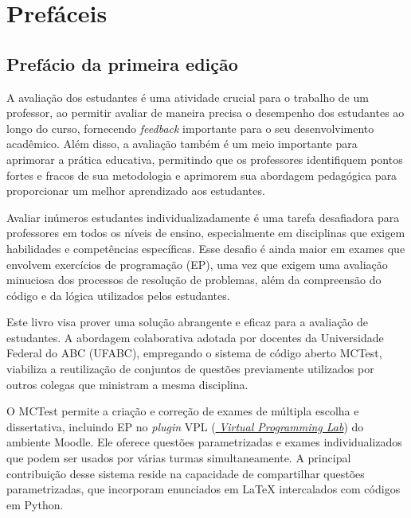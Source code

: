 \chapter*{Prefáceis}\normalsize

\section*{Prefácio da primeira edição}

A avaliação dos estudantes é uma atividade crucial para o trabalho de um professor, ao permitir avaliar de maneira precisa o desempenho dos estudantes ao longo do curso, fornecendo \textit{feedback} importante para o seu desenvolvimento acadêmico. Além disso, a avaliação também é um meio importante para aprimorar a prática educativa, permitindo que os professores identifiquem pontos fortes e fracos de sua metodologia e aprimorem sua abordagem pedagógica para proporcionar um melhor aprendizado aos estudantes.

Avaliar inúmeros estudantes individualizadamente é uma tarefa desafiadora para professores em todos os níveis de ensino, especialmente em disciplinas que exigem habilidades e competências específicas. Esse desafio é ainda maior em exames que envolvem exercícios de programação (EP), uma vez que exigem uma avaliação minuciosa dos processos de resolução de problemas, além da compreensão do código e da lógica utilizados pelos estudantes.

Este livro visa prover uma solução abrangente e eficaz para a avaliação de estudantes. A abordagem colaborativa adotada por docentes da Universidade Federal do ABC (UFABC), empregando o sistema de código aberto MCTest, viabiliza a reutilização de conjuntos de questões previamente utilizados por outros colegas que ministram a mesma disciplina.

O  MCTest permite a criação e correção de exames de múltipla escolha e dissertativa, incluindo EP no \textit{plugin} VPL (\href{https://vpl.dis.ulpgc.es}{ \textit{Virtual Programming Lab}}) do ambiente Moodle. Ele oferece questões parametrizadas e exames individualizados que podem ser usados por várias turmas simultaneamente. A principal contribuição desse sistema reside na capacidade de compartilhar questões parametrizadas, que incorporam enunciados em \LaTeX{} intercalados com códigos em Python. 


